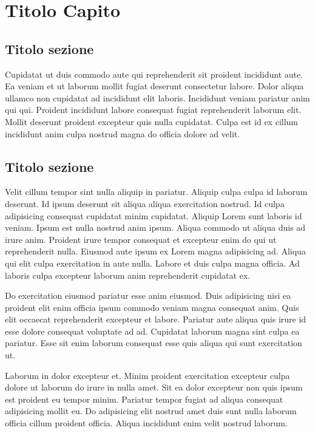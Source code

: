 \chapter{Titolo Capito}

\section{Titolo sezione}

Cupidatat ut duis commodo aute qui reprehenderit sit proident incididunt aute. Ea veniam et ut laborum mollit fugiat deserunt consectetur labore. Dolor aliqua ullamco non cupidatat ad incididunt elit laboris. Incididunt veniam pariatur anim qui qui. Proident incididunt labore consequat fugiat reprehenderit laborum elit. Mollit deserunt proident excepteur quis nulla cupidatat. Culpa est id ex cillum incididunt anim culpa nostrud magna do officia dolore ad velit.

\section{Titolo sezione}

Velit cillum tempor sint nulla aliquip in pariatur. Aliquip culpa culpa id laborum deserunt. Id ipsum deserunt sit aliqua aliqua exercitation nostrud. Id culpa adipisicing consequat cupidatat minim cupidatat. Aliquip Lorem sunt laboris id veniam.
Ipsum est nulla nostrud anim ipsum. Aliqua commodo ut aliqua duis ad irure anim. Proident irure tempor consequat et excepteur enim do qui ut reprehenderit nulla. Eiusmod aute ipsum ex Lorem magna adipisicing ad. Aliqua qui elit culpa exercitation in aute nulla. Labore et duis culpa magna officia. Ad laboris culpa excepteur laborum anim reprehenderit cupidatat ex.

Do exercitation eiusmod pariatur esse anim eiusmod. Duis adipisicing nisi ea proident elit enim officia ipsum commodo veniam magna consequat anim. Quis elit occaecat reprehenderit excepteur et labore. Pariatur aute aliqua quis irure id esse dolore consequat voluptate ad ad. Cupidatat laborum magna sint culpa ea pariatur. Esse sit enim laborum consequat esse quis aliqua qui sunt exercitation ut.

Laborum in dolor excepteur et. Minim proident exercitation excepteur culpa dolore ut laborum do irure in nulla amet. Sit ea dolor excepteur non quis ipsum est proident eu tempor minim. Pariatur tempor fugiat ad aliqua consequat adipisicing mollit eu. Do adipisicing elit nostrud amet duis sunt nulla laborum officia cillum proident officia. Aliqua incididunt enim velit nostrud laborum.

